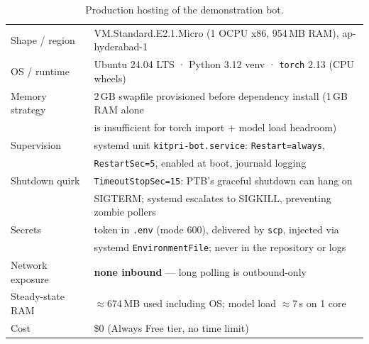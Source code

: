 \documentclass[11pt,a4paper]{article}
\begin{document}
\begin{table}[h]
\centering\small
\begin{tabular}{@{}ll@{}}
\toprule
Shape / region   & VM.Standard.E2.1.Micro (1 OCPU x86, 954\,MB RAM), ap-hyderabad-1 \\
OS / runtime     & Ubuntu 24.04 LTS · Python 3.12 venv · \texttt{torch} 2.13 (CPU wheels) \\
Memory strategy  & 2\,GB swapfile provisioned before dependency install (1\,GB RAM alone \\
                 & is insufficient for torch import + model load headroom) \\
Supervision      & systemd unit \texttt{kitpri-bot.service}: \texttt{Restart=always}, \\
                 & \texttt{RestartSec=5}, enabled at boot, journald logging \\
Shutdown quirk   & \texttt{TimeoutStopSec=15}: PTB's graceful shutdown can hang on \\
                 & SIGTERM; systemd escalates to SIGKILL, preventing zombie pollers \\
Secrets          & token in \texttt{.env} (mode 600), delivered by \texttt{scp}, injected via \\
                 & systemd \texttt{EnvironmentFile}; never in the repository or logs \\
Network exposure & \textbf{none inbound} --- long polling is outbound-only \\
Steady-state RAM & $\approx$674\,MB used including OS; model load $\approx$7\,s on 1 core \\
Cost             & \$0 (Always Free tier, no time limit) \\
\bottomrule
\end{tabular}
\caption{Production hosting of the demonstration bot.}
\label{tab:vm}
\end{table}
\end{document}
